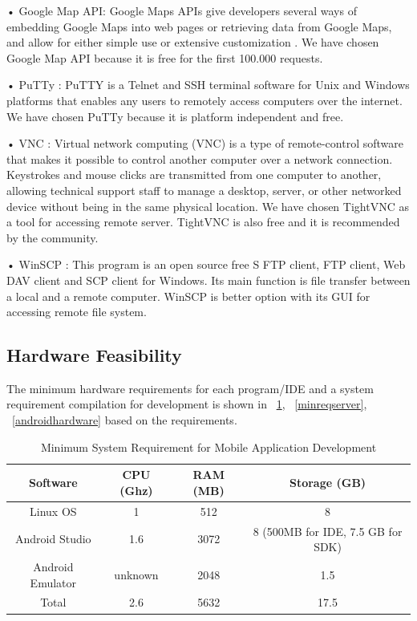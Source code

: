 • Google Map API: Google Maps APIs give developers several ways of embedding Google Maps into web pages or retrieving data from Google Maps, and allow for either simple use or extensive customization \cite{googleMapAPI}. 
We have chosen Google Map API because it is free for the first 100.000 requests.

• PuTTy : PuTTY is a Telnet and SSH terminal software for Unix and Windows platforms that enables any users to remotely access computers over the internet. 
\cite{PuttyTanim}
We have chosen PuTTy because it is platform independent and free.

• VNC : Virtual network computing (VNC) is a type of remote-control software that makes it possible to control another computer over a network connection. Keystrokes and mouse clicks are transmitted from one computer to another, allowing technical support staff to manage a desktop, server, or other networked device without being in the same physical location. 
\cite{VNCTanim}
We have chosen TightVNC as a tool for accessing remote server. TightVNC is also free and it is recommended by the community.

• WinSCP : This program is an open source free S FTP client, FTP client, Web DAV client and SCP client for Windows. Its main function is file transfer between a local and a remote computer.
\cite{WinSCPTanim}
 WinSCP is better option with its GUI for accessing remote file system. 

\subsection{Hardware Feasibility}
The minimum hardware requirements for each program/IDE and
a system requirement compilation for development is shown in ~\ref{minreqmobile}, ~\ref{minreqserver}, ~\ref{androidhardware} based on the requirements.

\begin{table}[!ht]
\centering
\caption{Minimum System Requirement for Mobile Application Development}
\label{minreqmobile}
\begin{tabular}{|c|c|c|c|}
\hline
\textbf{Software}& \textbf{CPU (Ghz)} & \textbf{RAM (MB)}  & \textbf{Storage (GB)} \\ \hline
Linux OS \cite{linuxMinimumSystemRequirements} & 1 & 512 & 8 \\ \hline
Android Studio \cite{androidMinimumSystemRequirements} & 1.6 & 3072  & 8 (500MB for IDE, 7.5 GB for SDK) \\ \hline
Android Emulator \cite{androidMinimumSystemRequirements} & unknown & 2048 & 1.5 \\ \hline
Total & 2.6 & 5632 & 17.5 \\ \hline
\end{tabular}
\end{table}

